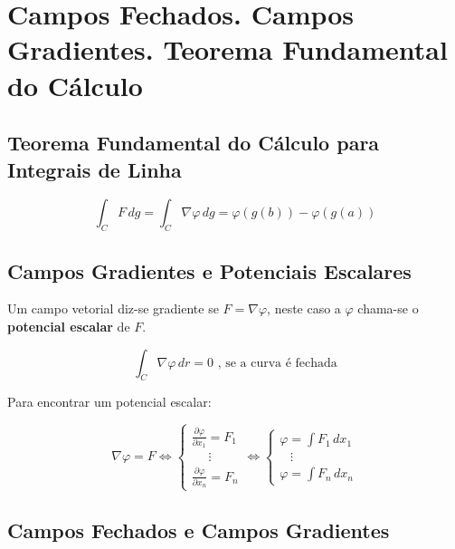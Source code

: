 \documentclass[11pt, a4paper]{article}
\begin{document}
\section{Campos Fechados. Campos Gradientes. Teorema Fundamental do Cálculo}

\subsection{Teorema Fundamental do Cálculo para Integrais de Linha}

\begin{equation*}
    \int_{C} F \, dg =
    \int_{C} \nabla\varphi \, dg =
    \varphi\left(g(b)\right) - \varphi\left(g(a)\right)
\end{equation*}

\subsection{Campos Gradientes e Potenciais Escalares}

Um campo vetorial diz-se gradiente se $F = \nabla\varphi$, neste caso a $\varphi$
chama-se o \textbf{potencial escalar} de $F$.

\begin{equation*}
    \int_{C} \nabla\varphi \, dr = 0 \text{ , se a curva é fechada}
\end{equation*}

Para encontrar um potencial escalar:

\begin{equation*}
    \nabla\varphi = F \Leftrightarrow
    \begin{cases}
        \frac{\partial \varphi}{\partial x_1} = F_1 \\
        \ \ \ \ \ \ \vdots                          \\
        \frac{\partial \varphi}{\partial x_n} = F_n
    \end{cases} \Leftrightarrow
    \begin{cases}
        \varphi = \int F_1 \, dx_1 \\
        \ \ \ \, \vdots            \\
        \varphi = \int F_n \, dx_n
    \end{cases}
\end{equation*}

\subsection{Campos Fechados e Campos Gradientes}
\end{document}
